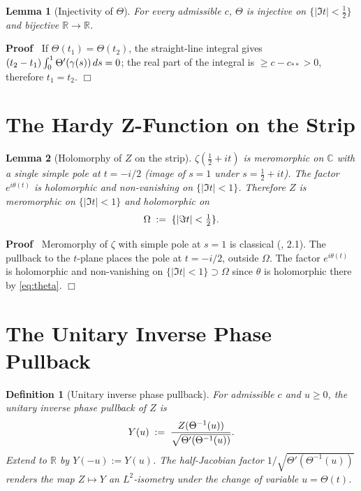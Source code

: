 \documentclass{article}
\newcommand{\assign}{:=}
\newcommand{\tmem}[1]{{\em #1\/}}
\newenvironment{proof}{\noindent\textbf{Proof\ }}{\hspace*{\fill}$\Box$\medskip}
\newtheorem{definition}{Definition}
\newtheorem{lemma}{Lemma}
\begin{document}
\begin{lemma}
  [Injectivity of $\Theta$]\label{lem:stripinj} For every admissible $c$,
  $\Theta$ is injective on $\{| \Im t| < \tfrac{1}{2} \}$ and bijective
  $\mathbb{R} \to \mathbb{R}$.
\end{lemma}

\begin{proof}
  If $\Theta (t_1) = \Theta (t_2)$, the straight-line integral gives $(t_2 -
  t_1)  \int_0^1 \Theta' (\gamma (s))  \hspace{0.17em} ds = 0$; the real part
  of the integral is $\ge c - c_{\ast \ast} > 0$, therefore $t_1 = t_2$.
\end{proof}

\section{The Hardy Z-Function on the Strip}

\begin{lemma}
  [Holomorphy of $Z$ on the strip]\label{lem:Zholo} $\zeta (\tfrac{1}{2} +
  it)$ is meromorphic on $\mathbb{C}$ with a single simple pole at $t = - i /
  2$ (image of $s = 1$ under $s = \tfrac{1}{2} + it$). The factor $e^{i \theta
  (t)}$ is holomorphic and non-vanishing on $\{| \Im t| < 1\}$. Therefore $Z$
  is meromorphic on $\{| \Im t| < 1\}$ and holomorphic on
  \[ \Omega \hspace{0.27em} \assign \hspace{0.27em} \{| \Im t| < \tfrac{1}{2}
     \} . \]
\end{lemma}

\begin{proof}
  Meromorphy of $\zeta$ with simple pole at $s = 1$ is classical
  ({\cite{Titchmarsh}}, {\textsection}2.1). The pullback to the $t$-plane
  places the pole at $t = - i / 2$, outside $\Omega$. The factor $e^{i \theta
  (t)}$ is holomorphic and non-vanishing on $\{| \Im t| < 1\} \supset \Omega$
  since $\theta$ is holomorphic there by \eqref{eq:theta}.
\end{proof}

\section{The Unitary Inverse Phase Pullback}

\begin{definition}
  [Unitary inverse phase pullback]\label{def:Htilde} For admissible $c$ and $u
  \ge 0$, the {\tmem{unitary inverse phase pullback}} of $Z$ is
  \[ Y (u) \hspace{0.27em} \assign \hspace{0.27em} \frac{Z (\Theta^{- 1}
     (u))}{\sqrt{\Theta' (\Theta^{- 1} (u))}} . \]
  Extend to $\mathbb{R}$ by $Y (- u) \assign Y (u)$. The half-Jacobian factor
  $1 / \sqrt{\Theta' (\Theta^{- 1} (u))}$ renders the map $Z \mapsto Y$ an
  $L^2$-isometry under the change of variable $u = \Theta (t)$.
\end{definition}
\end{document}
